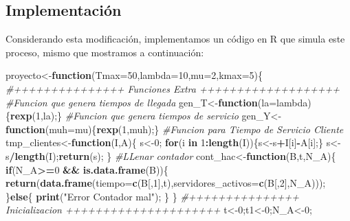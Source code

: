 \documentclass[]{article}
\newenvironment{Shaded}{\begin{snugshade}}{\end{snugshade}}
\newcommand{\KeywordTok}[1]{\textcolor[rgb]{0.13,0.29,0.53}{\textbf{#1}}}
\newcommand{\DataTypeTok}[1]{\textcolor[rgb]{0.13,0.29,0.53}{#1}}
\newcommand{\DecValTok}[1]{\textcolor[rgb]{0.00,0.00,0.81}{#1}}
\newcommand{\StringTok}[1]{\textcolor[rgb]{0.31,0.60,0.02}{#1}}
\newcommand{\CommentTok}[1]{\textcolor[rgb]{0.56,0.35,0.01}{\textit{#1}}}
\newcommand{\ControlFlowTok}[1]{\textcolor[rgb]{0.13,0.29,0.53}{\textbf{#1}}}
\newcommand{\OperatorTok}[1]{\textcolor[rgb]{0.81,0.36,0.00}{\textbf{#1}}}
\newcommand{\NormalTok}[1]{#1}
\begin{document}
\subsection{Implementación}\label{implementacion-1}

Considerando esta modificación, implementamos un código en R que simula
este proceso, mismo que mostramos a continuación:

\begin{Shaded}
\begin{Highlighting}[]
\NormalTok{proyecto<-}\ControlFlowTok{function}\NormalTok{(}\DataTypeTok{Tmax=}\DecValTok{50}\NormalTok{,}\DataTypeTok{lambda=}\DecValTok{10}\NormalTok{,}\DataTypeTok{mu=}\DecValTok{2}\NormalTok{,}\DataTypeTok{kmax=}\DecValTok{5}\NormalTok{)\{}
  \CommentTok{#+++++++++++++++ Funciones Extra +++++++++++++++++++}
  \CommentTok{#Funcion que genera tiempos de llegada }
\NormalTok{  gen_T<-}\ControlFlowTok{function}\NormalTok{(}\DataTypeTok{la=}\NormalTok{lambda)\{}\KeywordTok{rexp}\NormalTok{(}\DecValTok{1}\NormalTok{,la);\}}
  \CommentTok{#Funcion que genera tiempos de servicio}
\NormalTok{  gen_Y<-}\ControlFlowTok{function}\NormalTok{(}\DataTypeTok{muh=}\NormalTok{mu)\{}\KeywordTok{rexp}\NormalTok{(}\DecValTok{1}\NormalTok{,muh);\}}
  \CommentTok{#Funcion para Tiempo de Servicio Cliente}
\NormalTok{  tmp_clientes<-}\ControlFlowTok{function}\NormalTok{(I,A)\{}
\NormalTok{    s<-}\DecValTok{0}\NormalTok{;}
    \ControlFlowTok{for}\NormalTok{(i }\ControlFlowTok{in} \DecValTok{1}\OperatorTok{:}\KeywordTok{length}\NormalTok{(I))\{s<-s}\OperatorTok{+}\NormalTok{I[i]}\OperatorTok{-}\NormalTok{A[i];\}}
\NormalTok{    s<-s}\OperatorTok{/}\KeywordTok{length}\NormalTok{(I);}\KeywordTok{return}\NormalTok{(s);}
\NormalTok{  \}}
  \CommentTok{#LLenar contador}
\NormalTok{  cont_hac<-}\ControlFlowTok{function}\NormalTok{(B,t,N_A)\{}
    \ControlFlowTok{if}\NormalTok{(N_A}\OperatorTok{>=}\DecValTok{0} \OperatorTok{&&}\StringTok{ }\KeywordTok{is.data.frame}\NormalTok{(B))\{}
      \KeywordTok{return}\NormalTok{(}\KeywordTok{data.frame}\NormalTok{(}\DataTypeTok{tiempo=}\KeywordTok{c}\NormalTok{(B[,}\DecValTok{1}\NormalTok{],t),}\DataTypeTok{servidores_activos=}\KeywordTok{c}\NormalTok{(B[,}\DecValTok{2}\NormalTok{],N_A)));}
\NormalTok{    \}}\ControlFlowTok{else}\NormalTok{\{}
      \KeywordTok{print}\NormalTok{(}\StringTok{"Error Contador mal"}\NormalTok{);}
\NormalTok{    \}}
\NormalTok{  \}}
  \CommentTok{#+++++++++++++++ Inicializacion +++++++++++++++++++++}
\NormalTok{  t<-}\DecValTok{0}\NormalTok{;t1<-}\DecValTok{0}\NormalTok{;N_A<-}\DecValTok{0}\NormalTok{;}

\end{Highlighting}
\end{Shaded}
\end{document}
